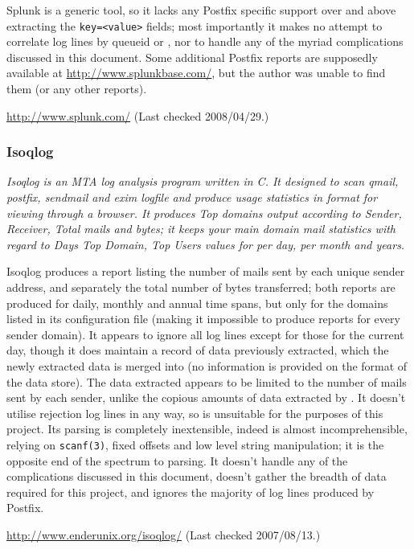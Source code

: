 Splunk is a generic tool, so it lacks any Postfix specific support over and
above extracting the \texttt{key=<value>} fields; most importantly it makes
no attempt to correlate log lines by queueid or \pid{}, nor to handle any
of the myriad complications discussed in this document.  Some additional
Postfix reports are supposedly available at
\url{http://www.splunkbase.com/}, but the author was unable to find them
(or any other reports).

\url{http://www.splunk.com/} \newline (Last checked 2008/04/29.)

\subsubsection{Isoqlog}

\textit{Isoqlog is an MTA log analysis program written in C. It designed to
scan qmail, postfix, sendmail and exim logfile and produce usage statistics
in \HTML{} format for viewing through a browser. It produces Top domains
output according to Sender, Receiver, Total mails and bytes; it keeps your
main domain mail statistics with regard to Days Top Domain, Top Users
values for per day, per month and years.\/}

Isoqlog produces a report listing the number of mails sent by each unique
sender address, and separately the total number of bytes transferred; both
reports are produced for daily, monthly and annual time spans, but only for
the domains listed in its configuration file (making it impossible to
produce reports for every sender domain).  It appears to ignore all log
lines except for those for the current day, though it does maintain a
record of data previously extracted, which the newly extracted data is
merged into (no information is provided on the format of the data store).
The data extracted appears to be limited to the number of mails sent by
each sender, unlike the copious amounts of data extracted by \parsername{}.
It doesn't utilise rejection log lines in any way, so is unsuitable for the
purposes of this project.  Its parsing is completely inextensible, indeed
is almost incomprehensible, relying on \texttt{scanf(3)}, fixed offsets and
low level string manipulation; it is the opposite end of the spectrum to
\parsernames{} parsing.  It doesn't handle any of the complications
discussed in this document, doesn't gather the breadth of data required for
this project, and ignores the majority of log lines produced by Postfix.

\url{http://www.enderunix.org/isoqlog/} \newline (Last checked 2007/08/13.)

